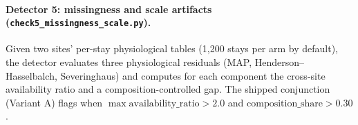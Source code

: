 \documentclass[10pt]{article}
\theoremstyle{definition}
\begin{document}
\paragraph{Detector 5: missingness and scale artifacts (\texttt{check5\_missingness\_scale.py}).}
Given two sites' per-stay physiological tables (1,200 stays per arm by default), the detector evaluates three physiological residuals (MAP, Henderson--Hasselbalch, Severinghaus) and computes for each component the cross-site availability ratio and a composition-controlled gap. The shipped conjunction (Variant A) flags when $\max\text{availability\_ratio} > 2.0$ and $\text{composition\_share} > 0.30$.
\end{document}
